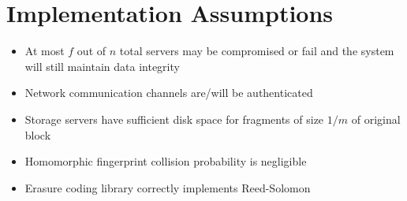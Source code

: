 \documentclass[../veristore_security_model.tex]{subfiles}
\begin{document}
\section{Implementation Assumptions}


\begin{itemize}
    \item At most $f$ out of $n$ total servers may be compromised or fail and the system will still maintain data integrity
    \item Network communication channels are/will be authenticated
    \item Storage servers have sufficient disk space for fragments of size $1/m$ of original block
    \item Homomorphic fingerprint collision probability is negligible
    \item Erasure coding library correctly implements Reed-Solomon
\end{itemize}

\newpage
\end{document}
